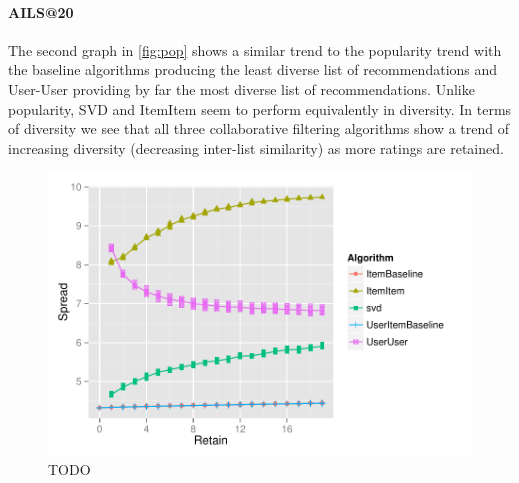 \documentclass[letterpaper]{sig-alternate}
\begin{document}
  \paragraph{AILS@20}
  The second graph in \ref{fig:pop} shows a similar trend to the popularity trend with the baseline algorithms producing the least diverse list of recommendations and User-User providing by far the most diverse list of recommendations.
  Unlike popularity, SVD and ItemItem seem to perform equivalently in diversity.
  In terms of diversity we see that all three collaborative filtering algorithms show a trend of increasing diversity (decreasing  inter-list similarity) as more ratings are retained.

\begin{figure}[]
  \centering
  \includegraphics[width=1.1\columnwidth]{../lenskit/output/ekstrandTuned20/topN_entropy.pdf}
  \caption{TODO}
  \label{fig:spread}
\end{figure}

\end{document}
